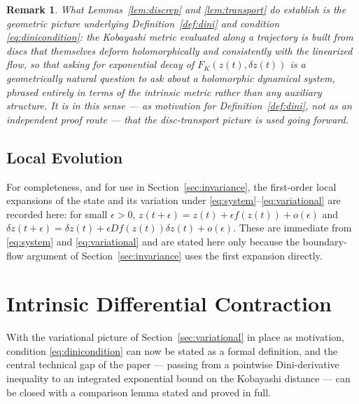 \documentclass[preprint,12pt,authoryear]{elsarticle}
\newtheorem{remark}{Remark}
\begin{document}
\begin{remark}
\label{rem:motivation}
What Lemmas~\ref{lem:discrep} and \ref{lem:transport} do establish is the geometric picture underlying Definition~\ref{def:dini} and condition \eqref{eq:dinicondition}: the Kobayashi metric evaluated along a trajectory is built from discs that themselves deform holomorphically and consistently with the linearized flow, so that asking for exponential decay of $F_K(z(t),\delta z(t))$ is a geometrically natural question to ask about a holomorphic dynamical system, phrased entirely in terms of the intrinsic metric rather than any auxiliary structure. It is in this sense — as motivation for Definition~\ref{def:dini}, not as an independent proof route — that the disc-transport picture is used going forward.
\end{remark}

\subsection{Local Evolution}

For completeness, and for use in Section~\ref{sec:invariance}, the first-order local expansions of the state and its variation under \eqref{eq:system}--\eqref{eq:variational} are recorded here: for small $\epsilon>0$, $z(t+\epsilon)=z(t)+\epsilon f(z(t))+o(\epsilon)$ and $\delta z(t+\epsilon)=\delta z(t)+\epsilon Df(z(t))\delta z(t)+o(\epsilon)$. These are immediate from \eqref{eq:system} and \eqref{eq:variational} and are stated here only because the boundary-flow argument of Section~\ref{sec:invariance} uses the first expansion directly.

%
%
%

\section{Intrinsic Differential Contraction}
\label{sec:intrinsic}

With the variational picture of Section~\ref{sec:variational} in place as motivation, condition \eqref{eq:dinicondition} can now be stated as a formal definition, and the central technical gap of the paper — passing from a pointwise Dini-derivative inequality to an integrated exponential bound on the Kobayashi distance — can be closed with a comparison lemma stated and proved in full.
\end{document}
